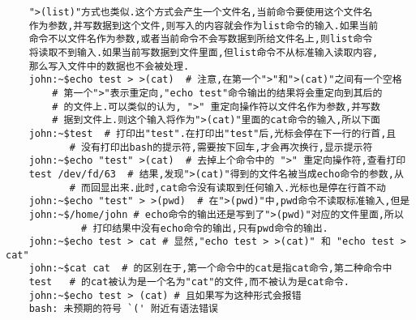\documentclass[draft,openany]{book}
\begin{document}
\begin{CJK}{UTF8}{gbsn}
\begin{verbatim}
    ">(list)"方式也类似.这个方式会产生一个文件名,当前命令要使用这个文件名
    作为参数,并写数据到这个文件,则写入的内容就会作为list命令的输入.如果当前
    命令不以文件名作为参数,或者当前命令不会写数据到所给文件名上,则list命令
    将读取不到输入.如果当前写数据到文件里面,但list命令不从标准输入读取内容,
    那么写入文件中的数据也不会被处理.
    john:~$echo test > >(cat)  # 注意,在第一个">"和">(cat)"之间有一个空格
        # 第一个">"表示重定向,"echo test"命令输出的结果将会重定向到其后的
        # 的文件上.可以类似的认为, ">" 重定向操作符以文件名作为参数,并写数
        # 据到文件上.则这个输入将作为">(cat)"里面的cat命令的输入,所以下面
    john:~$test  # 打印出"test".在打印出"test"后,光标会停在下一行的行首,且
           # 没有打印出bash的提示符,需要按下回车,才会再次换行,显示提示符
    john:~$echo "test" >(cat)  # 去掉上个命令中的 ">" 重定向操作符,查看打印
    test /dev/fd/63  # 结果,发现">(cat)"得到的文件名被当成echo命令的参数,从
           # 而回显出来.此时,cat命令没有读取到任何输入.光标也是停在行首不动
    john:~$echo "test" > >(pwd)  # 在">(pwd)"中,pwd命令不读取标准输入,但是
    john:~$/home/john # echo命令的输出还是写到了">(pwd)"对应的文件里面,所以
             # 打印结果中没有echo命令的输出,只有pwd命令的输出.
    john:~$echo test > cat # 显然,"echo test > >(cat)" 和 "echo test > cat"
    john:~$cat cat  # 的区别在于,第一个命令中的cat是指cat命令,第二种命令中
    test   # 的cat被认为是一个名为"cat"的文件,而不被认为是cat命令.
    john:~$echo test > (cat) # 且如果写为这种形式会报错
    bash: 未预期的符号 `(' 附近有语法错误
    \end{verbatim}


\end{CJK}
\end{document}
